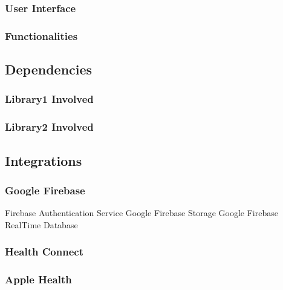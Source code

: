 \subsubsection{User Interface}
\subsubsection{Functionalities}
\subsection{Dependencies}
\subsubsection{Library1 Involved}
\subsubsection{Library2 Involved}
\subsection{Integrations}
\subsubsection{Google Firebase}
Firebase Authentication Service
Google Firebase Storage
Google Firebase RealTime Database
\subsubsection{Health Connect}
\subsubsection{Apple Health}